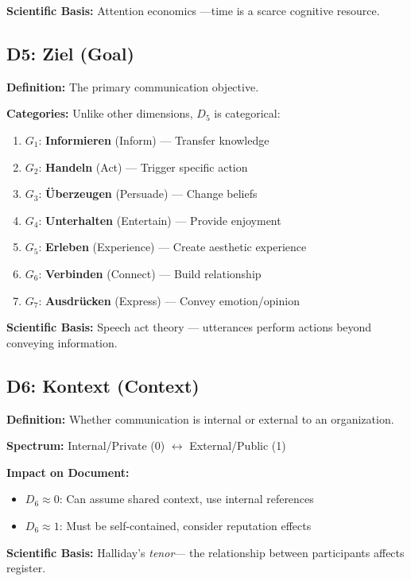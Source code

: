 \textbf{Scientific Basis:} Attention economics \citep{davenport2001}---time is
a scarce cognitive resource.

\subsection{D5: Ziel (Goal)}

\textbf{Definition:} The primary communication objective.

\textbf{Categories:} Unlike other dimensions, $D_5$ is categorical:

\begin{enumerate}[nosep]
\item $G_1$: \textbf{Informieren} (Inform) --- Transfer knowledge
\item $G_2$: \textbf{Handeln} (Act) --- Trigger specific action
\item $G_3$: \textbf{\"Uberzeugen} (Persuade) --- Change beliefs
\item $G_4$: \textbf{Unterhalten} (Entertain) --- Provide enjoyment
\item $G_5$: \textbf{Erleben} (Experience) --- Create aesthetic experience
\item $G_6$: \textbf{Verbinden} (Connect) --- Build relationship
\item $G_7$: \textbf{Ausdr\"ucken} (Express) --- Convey emotion/opinion
\end{enumerate}

\textbf{Scientific Basis:} Speech act theory \citep{austin1962, searle1969}---
utterances perform actions beyond conveying information.

\subsection{D6: Kontext (Context)}

\textbf{Definition:} Whether communication is internal or external to an organization.

\textbf{Spectrum:} Internal/Private (0) $\leftrightarrow$ External/Public (1)

\textbf{Impact on Document:}
\begin{itemize}[nosep]
\item $D_6 \approx 0$: Can assume shared context, use internal references
\item $D_6 \approx 1$: Must be self-contained, consider reputation effects
\end{itemize}

\textbf{Scientific Basis:} Halliday's \citeyearpar{halliday1989} \textit{tenor}---
the relationship between participants affects register.

